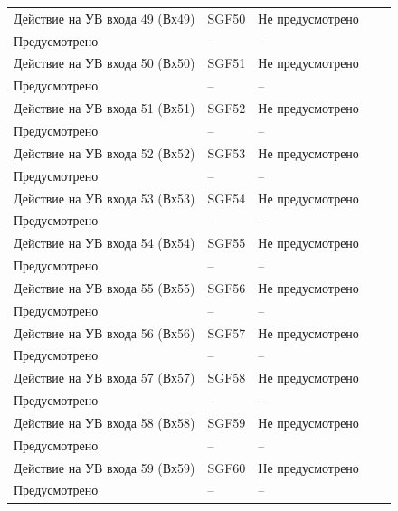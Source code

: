 \begin{longtable}{|>{\centering\arraybackslash}m{5.3cm}|>{\centering\arraybackslash}m{3.3cm}|>{\centering\arraybackslash}m{4.2cm}|>{\centering\arraybackslash}m{1.8cm}|>{\centering\arraybackslash}m{1cm}|}
\hline
\centering Действие на УВ входа 49 (Вх49)  & \centering SGF50 & \centering Не предусмотрено \\ Предусмотрено & \centering -- & \centering \arraybackslash -- \\
\hline
\centering Действие на УВ входа 50 (Вх50)  & \centering SGF51 & \centering Не предусмотрено \\ Предусмотрено & \centering -- & \centering \arraybackslash -- \\
\hline
\centering Действие на УВ входа 51 (Вх51)  & \centering SGF52 & \centering Не предусмотрено \\ Предусмотрено & \centering -- & \centering \arraybackslash -- \\
\hline
\centering Действие на УВ входа 52 (Вх52)  & \centering SGF53 & \centering Не предусмотрено \\ Предусмотрено & \centering -- & \centering \arraybackslash -- \\
\hline
\centering Действие на УВ входа 53 (Вх53)  & \centering SGF54 & \centering Не предусмотрено \\ Предусмотрено & \centering -- & \centering \arraybackslash -- \\
\hline
\centering Действие на УВ входа 54 (Вх54)  & \centering SGF55 & \centering Не предусмотрено \\ Предусмотрено & \centering -- & \centering \arraybackslash -- \\
\hline
\centering Действие на УВ входа 55 (Вх55)  & \centering SGF56 & \centering Не предусмотрено \\ Предусмотрено & \centering -- & \centering \arraybackslash -- \\
\hline
\centering Действие на УВ входа 56 (Вх56)  & \centering SGF57 & \centering Не предусмотрено \\ Предусмотрено & \centering -- & \centering \arraybackslash -- \\
\hline
\centering Действие на УВ входа 57 (Вх57)  & \centering SGF58 & \centering Не предусмотрено \\ Предусмотрено & \centering -- & \centering \arraybackslash -- \\
\hline
\centering Действие на УВ входа 58 (Вх58)  & \centering SGF59 & \centering Не предусмотрено \\ Предусмотрено & \centering -- & \centering \arraybackslash -- \\
\hline
\centering Действие на УВ входа 59 (Вх59)  & \centering SGF60 & \centering Не предусмотрено \\ Предусмотрено & \centering -- & \centering \arraybackslash -- \\

\end{longtable}
